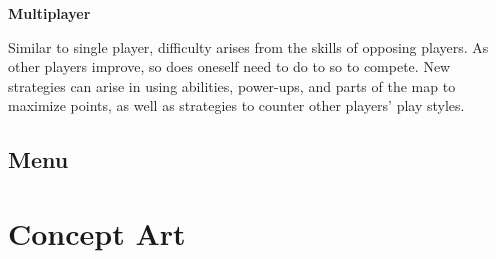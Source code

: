 \documentclass{article}
\theoremstyle{definition}
\begin{document}
\textbf{Multiplayer}

Similar to single player, difficulty arises from the skills of opposing
players. As other players improve, so does oneself need to do to so to compete.
New strategies can arise in using abilities, power-ups, and parts of the map to
maximize points, as well as strategies to counter other players' play styles.

\subsection{Menu}

\section{Concept Art}
\end{document}
